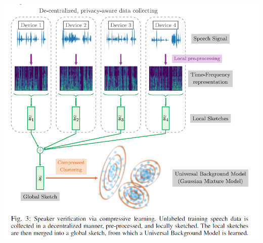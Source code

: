 \documentclass[11pt]{article} %
\begin{document}
\includegraphics[width=\textwidth]{sketching_speak}
\par
\end{document}
